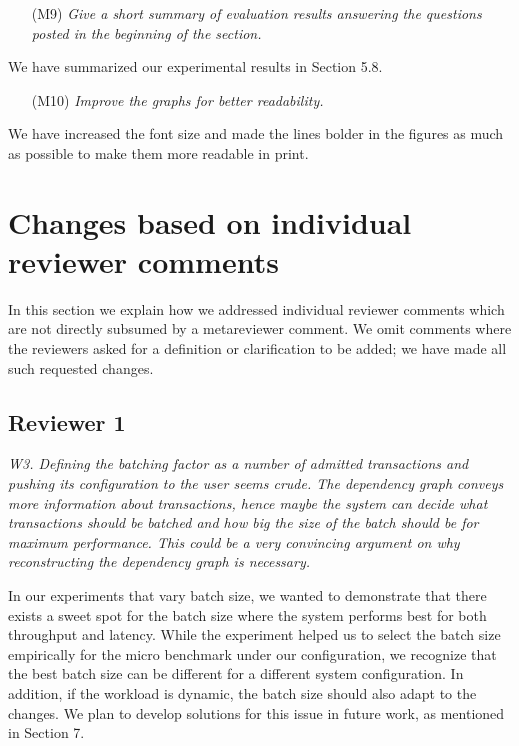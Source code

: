 \documentclass{article}
\begin{document}
\begin{itemize}
\item[(M9)] \emph{Give a short summary of evaluation results answering the questions posted in the beginning of the section.}
\end{itemize}
We have summarized our experimental results in Section 5.8.

\begin{itemize}
\item[(M10)] \emph{Improve the graphs for better readability.}
\end{itemize}
We have increased the font size and made the lines bolder in the figures as much as possible to make them more readable in print.

\section{Changes based on individual reviewer comments}

In this section we explain how we addressed individual reviewer comments which are not directly subsumed by a metareviewer comment. We omit comments where the reviewers asked for a definition or clarification to be added; we have made all such requested changes.

\subsection{Reviewer 1}

\emph{W3. Defining the batching factor as a number of admitted transactions and pushing its configuration to the user seems crude. The dependency graph conveys more information about transactions, hence maybe the system can decide what transactions should be batched and how big the size of the batch should be for maximum performance. This could be a very convincing argument on why reconstructing the dependency graph is necessary.}

In our experiments that vary batch size, we wanted to demonstrate that there exists a sweet spot for the batch size where the system performs best for both throughput and latency. While the experiment helped us to select the batch size empirically for the micro benchmark under our configuration, we recognize that the best batch size can be different for a different system configuration. In addition, if the workload is dynamic, the batch size should also adapt to the changes. We plan to develop solutions for this issue in future work, as mentioned in Section 7.
\end{document}
